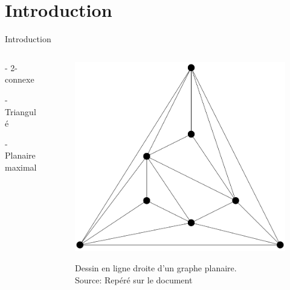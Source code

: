 \documentclass[10pt]{beamer}
\begin{document}
\section[Introduction]{Introduction}
\begin{frame}{Introduction}
\begin{columns}
\begin{column}{0.3\textwidth}
    \centering
    \begin{block}{}
    - 2-connexe
    \end{block}
    \begin{block}{}    
    - Triangulé \\ [.5cm]    
    \end{block}
    \begin{block}{}        
    - Planaire maximal 
    \end{block}
\end{column}
    
    \begin{column}{0.6\textwidth}
    
	\begin{figure}	
	\centering	
	\includegraphics[height=0.5\textheight]{lineDroite.png}\\[.1cm]
    \caption[caption]{Dessin en ligne droite d’un graphe planaire.  \\\vspace*{0.3cm} Source: Repéré sur le document \citeauthor{TakaoSaidur}}	
	\end{figure}	
    \end{column}
\end{columns}  

\end{frame}
\end{document}

